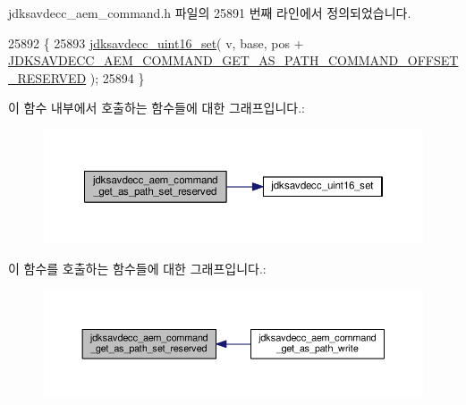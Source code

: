 jdksavdecc\+\_\+aem\+\_\+command.\+h 파일의 25891 번째 라인에서 정의되었습니다.


\begin{DoxyCode}
25892 \{
25893     \hyperlink{group__endian_ga14b9eeadc05f94334096c127c955a60b}{jdksavdecc\_uint16\_set}( v, base, pos + 
      \hyperlink{group__command__get__as__path_ga4fe9082649795646922035d2ba9165a7}{JDKSAVDECC\_AEM\_COMMAND\_GET\_AS\_PATH\_COMMAND\_OFFSET\_RESERVED}
       );
25894 \}
\end{DoxyCode}


이 함수 내부에서 호출하는 함수들에 대한 그래프입니다.\+:
\nopagebreak
\begin{figure}[H]
\begin{center}
\leavevmode
\includegraphics[width=350pt]{group__command__get__as__path_ga13cea446e3aceee3101e3e07c67b2f29_cgraph}
\end{center}
\end{figure}




이 함수를 호출하는 함수들에 대한 그래프입니다.\+:
\nopagebreak
\begin{figure}[H]
\begin{center}
\leavevmode
\includegraphics[width=350pt]{group__command__get__as__path_ga13cea446e3aceee3101e3e07c67b2f29_icgraph}
\end{center}
\end{figure}


